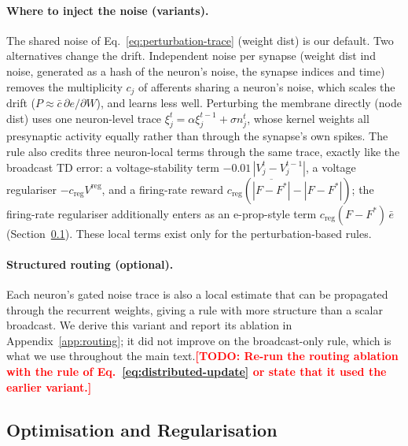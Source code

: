 \documentclass[10pt,twocolumn]{article}
\newcommand{\todo}[1]{\textcolor{red}{\bfseries[TODO: #1]}}
\newcommand{\variant}[1]{\textsf{#1}} %
\begin{document}
\paragraph{Where to inject the noise (variants).}
The shared noise of Eq.~\eqref{eq:perturbation-trace} (\variant{weight dist}) is
our default. Two alternatives change the drift. Independent noise per synapse
(\variant{weight dist ind noise}, generated as a hash of the neuron's noise, the
synapse indices and time) removes the multiplicity $c_j$ of afferents sharing a
neuron's noise, which scales the drift ($P\approx\bar c\,\partial e/\partial W$),
and learns less well. Perturbing the membrane directly (\variant{node dist}) uses
one neuron-level trace $\xi^t_j=\alpha\xi^{t-1}_j+\sigma n^t_j$, whose kernel weights
all presynaptic activity equally rather than through the synapse's own spikes. The
rule also credits three neuron-local terms through the same trace, exactly like the
broadcast TD error: a voltage-stability term $-0.01\,|V^t_j-V^{t-1}_j|$, a voltage
regulariser $-c_{\mathrm{reg}}V^{\mathrm{reg}}$, and a firing-rate reward
$c_{\mathrm{reg}}(\overline{|F-F^*|}-|F-F^*|)$; the firing-rate regulariser
additionally enters as an e-prop-style term $c_{\mathrm{reg}}(F-F^*)\,\bar e$
(Section~\ref{sec:optimiser}). These local terms exist only for the perturbation-based
rules.

\paragraph{Structured routing (optional).}
Each neuron's gated noise trace is also a local estimate that can be propagated
through the recurrent weights, giving a rule with more structure than a scalar
broadcast. We derive this variant and report its ablation in
Appendix~\ref{app:routing}; it did not improve on the broadcast-only rule, which is
what we use throughout the main text.\todo{Re-run the routing ablation with the
rule of Eq.~\eqref{eq:distributed-update} or state that it used the earlier variant.}

\subsection{Optimisation and Regularisation}
\label{sec:optimiser}
\end{document}
